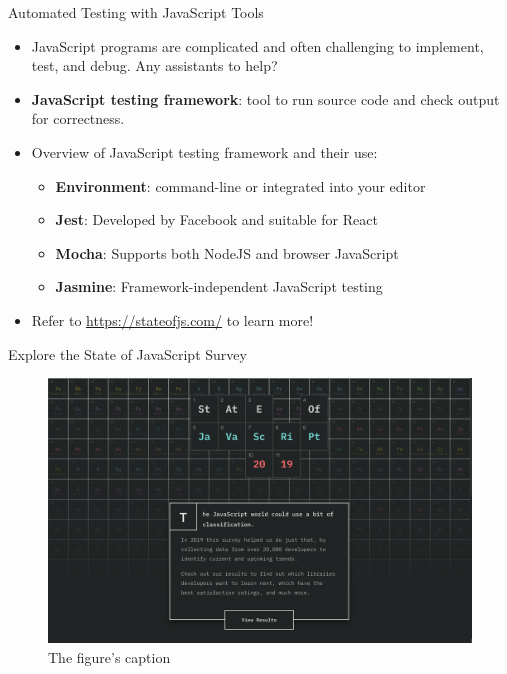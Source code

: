 \documentclass[14pt,aspectratio=169]{beamer}
\begin{document}
%
\begin{frame}{Automated Testing with JavaScript Tools}
  \begin{itemize}
    \item JavaScript programs are complicated and often challenging to
      implement, test, and debug. Any assistants to help?
      \vspace*{-.15in}
    \item {\bf JavaScript testing framework}: tool to run source code and check
      output for correctness.
      \vspace*{-.15in}
    \item Overview of JavaScript testing framework and their use:
      \begin{itemize}
        \item {\bf Environment}: command-line or integrated into your editor
        \item {\bf Jest}: Developed by Facebook and suitable for React
        \item {\bf Mocha}: Supports both NodeJS and browser JavaScript
        \item {\bf Jasmine}: Framework-independent JavaScript testing
      \end{itemize}
      \vspace*{-.25in}
    \item Refer to \url{https://stateofjs.com/} to learn more!
  \end{itemize}
\end{frame}

%
\begin{frame}{Explore the State of JavaScript Survey}
  \begin{figure}
    \centering
    \includegraphics[scale=.085]{images/stateofjs.png}
    \caption{The figure's caption}
  \end{figure}
\end{frame}
\end{document}
